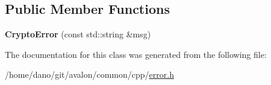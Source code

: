 \subsection*{Public Member Functions}
\begin{DoxyCompactItemize}
\item 
\mbox{\label{classtcf_1_1error_1_1CryptoError_a84921639867eb415a4c4f47538e38465}} 
{\bfseries Crypto\+Error} (const std\+::string \&msg)
\end{DoxyCompactItemize}


The documentation for this class was generated from the following file\+:\begin{DoxyCompactItemize}
\item 
/home/dano/git/avalon/common/cpp/\hyperlink{error_8h}{error.\+h}\end{DoxyCompactItemize}
